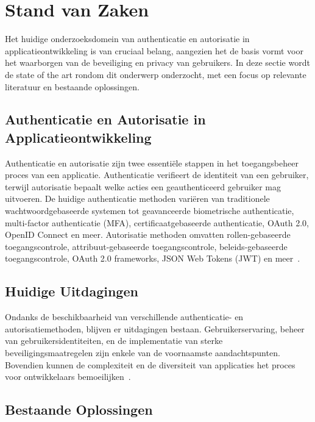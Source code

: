 
\section{Stand van Zaken}%
\label{sec:state-of-the-art}

Het huidige onderzoeksdomein van authenticatie en autorisatie in applicatieontwikkeling is van cruciaal belang, aangezien het de basis vormt voor het
waarborgen van de beveiliging en privacy van gebruikers. In deze sectie wordt de state of the art rondom dit onderwerp onderzocht, met een focus op
relevante literatuur en bestaande oplossingen.

\subsection{Authenticatie en Autorisatie in Applicatieontwikkeling}

Authenticatie en autorisatie zijn twee essentiële stappen in het toegangsbeheer proces van een applicatie. Authenticatie verifieert de identiteit van
een gebruiker, terwijl autorisatie bepaalt welke acties een geauthenticeerd gebruiker mag uitvoeren. De huidige authenticatie methoden variëren van
traditionele wachtwoordgebaseerde systemen tot geavanceerde biometrische authenticatie, multi-factor authenticatie (MFA), certificaatgebaseerde authenticatie, OAuth 2.0, OpenID Connect en meer.
Autorisatie methoden omvatten rollen-gebaseerde toegangscontrole, attribuut-gebaseerde toegangscontrole, beleids-gebaseerde toegangscontrole, OAuth 2.0 frameworks, JSON Web Tokens (JWT)
en meer~\autocite{Hardt2012}.

\subsection{Huidige Uitdagingen}

Ondanks de beschikbaarheid van verschillende authenticatie- en autorisatiemethoden, blijven er uitdagingen bestaan. Gebruikerservaring, beheer van
gebruikersidentiteiten, en de implementatie van sterke beveiligingsmaatregelen zijn enkele van de voornaamste aandachtspunten. Bovendien kunnen de
complexiteit en de diversiteit van applicaties het proces voor ontwikkelaars bemoeilijken~\autocite{Bakar2013}.

\subsection{Bestaande Oplossingen}

